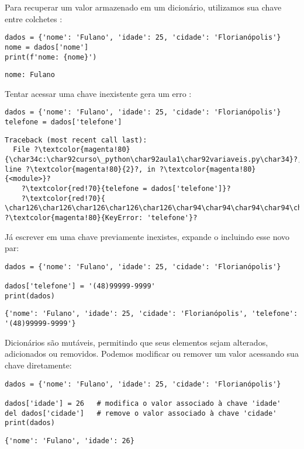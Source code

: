 Para recuperar um valor armazenado em um dicionário, utilizamos sua chave entre colchetes \inlcode{[]}:
\begin{verbatim}
dados = {'nome': 'Fulano', 'idade': 25, 'cidade': 'Florianópolis'}
nome = dados['nome']
print(f'nome: {nome}')
\end{verbatim}
\begin{verbatim}
nome: Fulano
\end{verbatim}

Tentar acessar uma chave inexistente gera um erro :
\begin{verbatim}
dados = {'nome': 'Fulano', 'idade': 25, 'cidade': 'Florianópolis'}
telefone = dados['telefone']
\end{verbatim}
\begin{verbatim}
Traceback (most recent call last):
  File ?\textcolor{magenta!80}{\char34c:\char92curso\_python\char92aula1\char92variaveis.py\char34}?, line ?\textcolor{magenta!80}{2}?, in ?\textcolor{magenta!80}{<module>}?
    ?\textcolor{red!70}{telefone = dados['telefone']}?
    ?\textcolor{red!70}{           \char126\char126\char126\char126\char126\char94\char94\char94\char94\char94\char94\char94\char94\char94\char94\char94\char94}?
?\textcolor{magenta!80}{KeyError: 'telefone'}?
\end{verbatim}

Já escrever em uma chave previamente inexistes, expande o  incluindo esse novo par:
\begin{verbatim}
dados = {'nome': 'Fulano', 'idade': 25, 'cidade': 'Florianópolis'}

dados['telefone'] = '(48)99999-9999'
print(dados)
\end{verbatim}
\begin{verbatim}
{'nome': 'Fulano', 'idade': 25, 'cidade': 'Florianópolis', 'telefone': '(48)99999-9999'}
\end{verbatim}

Dicionários são mutáveis, permitindo que seus elementos sejam alterados, adicionados ou removidos.
Podemos modificar ou remover um valor acessando sua chave diretamente:
\begin{verbatim}
dados = {'nome': 'Fulano', 'idade': 25, 'cidade': 'Florianópolis'}

dados['idade'] = 26   # modifica o valor associado à chave 'idade'
del dados['cidade']   # remove o valor associado à chave 'cidade'
print(dados)
\end{verbatim}
\begin{verbatim}
{'nome': 'Fulano', 'idade': 26}
\end{verbatim}

